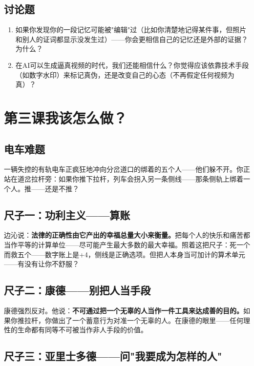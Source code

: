 \documentclass[a4paper,12pt]{ctexart}
\begin{document}
\subsection*{讨论题}
\begin{enumerate}
  \item 如果你发现你的一段记忆可能被"编辑"过（比如你清楚地记得某件事，但照片和别人的证词都显示没发生过）——你会更相信自己的记忆还是外部的证据？为什么？
  \item 在AI可以生成逼真视频的时代，我们还能相信什么？你觉得应该依靠技术手段（如数字水印）来标记真伪，还是改变自己的心态（不再假定任何视频为真）？
\end{enumerate}

\newpage
\section{\textcolor{orange!80!black}{第三课\quad 我该怎么做？}}

\subsection*{电车难题}

一辆失控的有轨电车正疯狂地冲向分岔道口的绑着的五个人——他们躲不开。你正站在道岔拉杆旁：如果你推下拉杆，列车会拐入另一条侧线——那条侧轨上绑着一个人。推——还是不推？

\subsection*{尺子一：功利主义——算账}

边沁说：\textbf{法律的正确性由它产出的幸福总量大小来衡量。}把每个人的快乐和痛苦都当作平等的计算单位——尽可能产生最大多数的最大幸福。照着这把尺子：死一个而救五个——数字账上是+4，侧线是正确选项。但把人本身当可加计的算术单元——有没有让你不舒服？

\subsection*{尺子二：康德——别把人当手段}

康德强烈反对。他说：\textbf{不可通过把一个无辜的人当作一件工具来达成善的目的。}如果你推拉杆，你做出了一个蓄意行为对准一个无辜的人。在康德的眼里——任何理性的生命都有同等不可被当作非人手段的价值。

\subsection*{尺子三：亚里士多德——问"我要成为怎样的人"}
\end{document}
